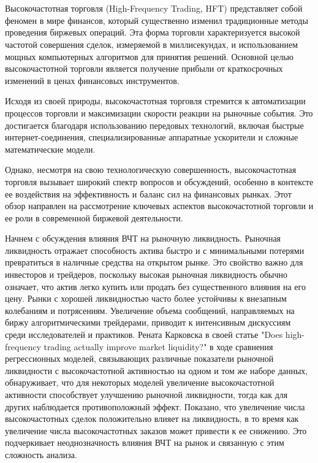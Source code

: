 \documentclass{letask}
\begin{document}
	
 
\begin{flushright}
	\textit{}\\
	\textit{}\\
\end{flushright}

\fontsize{14}{14}\selectfont 

Высокочастотная торговля (High-Frequency Trading, HFT) представляет собой феномен в мире финансов, который существенно изменил традиционные методы проведения биржевых операций. Эта форма торговли характеризуется высокой частотой совершения сделок, измеряемой в миллисекундах, и использованием мощных компьютерных алгоритмов для принятия решений. Основной целью высокочастотной торговли является получение прибыли от краткосрочных изменений в ценах финансовых инструментов.

Исходя из своей природы, высокочастотная торговля стремится к автоматизации процессов торговли и максимизации скорости реакции на рыночные события. Это достигается благодаря использованию передовых технологий, включая быстрые интернет-соединения, специализированные аппаратные ускорители и сложные математические модели.

Однако, несмотря на свою технологическую совершенность, высокочастотная торговля вызывает широкий спектр вопросов и обсуждений, особенно в контексте ее воздействия на эффективность и баланс сил на финансовых рынках. Этот обзор направлен на рассмотрение ключевых аспектов высокочастотной торговли и ее роли в современной биржевой деятельности.

Начнем с обсуждения влияния ВЧТ на рыночную ликвидность. Рыночная ликвидность отражает способность актива быстро и с минимальными потерями превратиться в наличные средства на открытом рынке. Это свойство важно для инвесторов и трейдеров, поскольку высокая рыночная ликвидность обычно означает, что актив легко купить или продать без существенного влияния на его цену. Рынки с хорошей ликвидностью часто более устойчивы к внезапным колебаниям и потрясениям. Увеличение объема сообщений, направляемых на биржу алгоритмическими трейдерами, приводит к интенсивным дискуссиям среди исследователей и практиков. Рената Карковска в своей статье "Does high-frequency trading actually improve market liquidity?" в ходе сравнения регрессионных моделей, связывающих различные показатели рыночной ликвидности с высокочастотной активностью на одном и том же наборе данных, обнаруживает, что для некоторых моделей увеличение высокочастотной активности способствует улучшению рыночной ликвидности, тогда как для других наблюдается противоположный эффект. Показано, что увеличение числа высокочастотных сделок положительно влияет на ликвидность, в то время как увеличение числа высокочастотных заказов может привести к ее снижению. Это подчеркивает неоднозначность влияния ВЧТ на рынок и связанную с этим сложность анализа.
\end{document}
